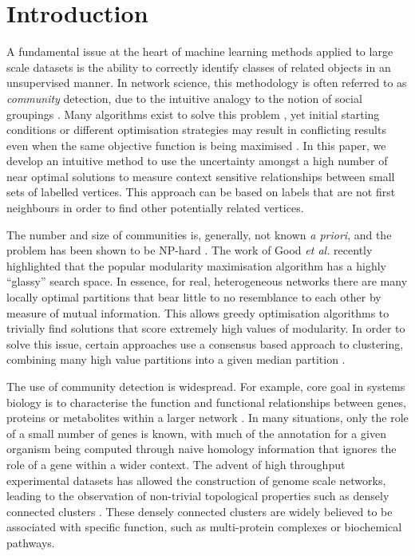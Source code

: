 \documentclass[sigconf]{acmart}
\begin{document}
\section{Introduction}

A fundamental issue at the heart of machine learning methods applied to large scale datasets is the ability to correctly identify classes of related objects in an unsupervised manner.
In network science, this methodology is often referred to as \textit{community} detection, due to the intuitive analogy to the notion of social groupings \cite{fortunato2010community}.
Many algorithms exist to solve this problem \cite{fortunato2016community}, yet initial starting conditions or different optimisation strategies may result in conflicting results even when the same objective function is being maximised \cite{good2010performance}.
In this paper, we develop an intuitive method to use the uncertainty amongst a high number of near optimal solutions to measure context sensitive relationships between small sets of labelled vertices.
This approach can be based on labels that are not first neighbours in order to find other potentially related vertices.

The number and size of communities is, generally, not known \textit{a priori}, and the problem has been shown to be NP-hard \cite{npHardModularity}.
The work of Good \textit{et al.} \cite{good2010performance} recently highlighted that the popular modularity maximisation algorithm has a highly ``glassy'' search space.
In essence, for real, heterogeneous networks there are many locally optimal partitions that bear little to no resemblance to each other by measure of mutual information.
This allows greedy optimisation algorithms \cite{blondel2008fast} to trivially find solutions that score extremely high values of modularity.
In order to solve this issue, certain approaches use a consensus based approach to clustering, combining many high value partitions into a given median partition \cite{lancichinetti2012consensus}.

The use of community detection is widespread.
For example, core goal in systems biology is to characterise the function and functional relationships between genes, proteins or metabolites within a larger network \cite{girvan2002community}.
In many situations, only the role of a small number of genes is known, with much of the annotation for a given organism being computed through naive homology information that ignores the role of a gene within a wider context.
The advent of high throughput experimental datasets has allowed the construction of genome scale networks, leading to the observation of non-trivial topological properties such as densely connected clusters \cite{ArabidopsisConsortium2011}.
These densely connected clusters are widely believed to be associated with specific function, such as multi-protein complexes or biochemical pathways.
\end{document}
